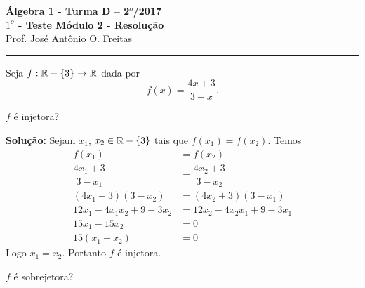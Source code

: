 \documentclass[12pt]{article}
\begin{document}


\begin{center}
{\Large\bf {\'A}lgebra 1 - Turma D -- 2$^{o}$/2017} \\ \vspace{9pt} {\large\bf
  $1^{\underline{o}}$ - Teste Módulo 2 - Resolu\c{c}\~ao}\\
\vspace{9pt} Prof. Jos{\'e} Ant{\^o}nio O. Freitas
\end{center}
\hrule

\vspace{.6cm}

Seja $f : \mathbb{R} -\{3\} \to \mathbb{R}$ dada por
\[
	f(x) = \dfrac{4x + 3}{3 - x}.
\]

\questao $f$ é injetora?

\noindent\textbf{Solu\c{c}\~ao:} Sejam $x_1$, $x_2 \in \mathbb{R} - \{3\}$ tais que $f(x_1) = f(x_2)$. Temos
\begin{align*}
	f(x_1) &= f(x_2)\\
	\dfrac{4x_1 + 3}{3 - x_1} &= \dfrac{4x_2 + 3}{3 - x_2}\\
	(4x_1 + 3)(3 - x_2) &= (4x_2 + 3)(3 - x_1)\\
	12x_1 - 4x_1x_2 + 9 - 3x_2 &= 12x_2 - 4x_2x_1 + 9 - 3x_1\\
	15x_1 - 15x_2 &= 0\\
	15(x_1 - x_2) &= 0
\end{align*}
Logo $x_1 = x_2$. Portanto $f$ é injetora.

\vspace{.5cm}

\questao $f$ é sobrejetora?
\end{document}
